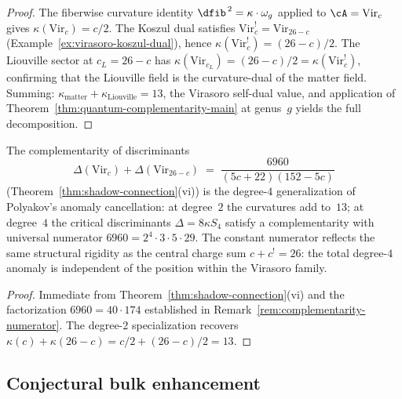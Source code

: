 \begin{proof}
The fiberwise curvature identity $\dfib^{\,2} = \kappa \cdot \omega_g$
applied to $\cA = \mathrm{Vir}_c$ gives
$\kappa(\mathrm{Vir}_c) = c/2$. The Koszul dual satisfies
$\mathrm{Vir}_c^! = \mathrm{Vir}_{26-c}$
(Example~\ref{ex:virasoro-koszul-dual}), hence
$\kappa(\mathrm{Vir}_c^!) = (26{-}c)/2$. The Liouville sector at
$c_L = 26 - c$ has $\kappa(\mathrm{Vir}_{c_L}) = (26{-}c)/2
= \kappa(\mathrm{Vir}_c^!)$, confirming that the Liouville field
is the curvature-dual of the matter field. Summing:
$\kappa_{\mathrm{matter}} + \kappa_{\mathrm{Liouville}} = 13$,
the Virasoro self-dual value, and application of
Theorem~\ref{thm:quantum-complementarity-main} at genus~$g$ yields
the full decomposition.
\end{proof}

\begin{corollary}
\label{cor:complementarity-discriminant-cancellation}
The complementarity of discriminants
\[
\Delta(\mathrm{Vir}_c) + \Delta(\mathrm{Vir}_{26-c})
\;=\;
\frac{6960}{(5c{+}22)(152{-}5c)}
\]
\textup{(}Theorem~\textup{\ref{thm:shadow-connection}(vi))} is the
degree-$4$ generalization of Polyakov's anomaly cancellation: at
degree~$2$ the curvatures add to~$13$\textup{;}
at degree~$4$ the critical discriminants
$\Delta = 8\kappa S_4$ satisfy a complementarity with universal
numerator $6960 = 2^4 \cdot 3 \cdot 5 \cdot 29$. The constant
numerator reflects the same structural rigidity as the central
charge sum $c + c^! = 26$: the total degree-$4$ anomaly is
independent of the position within the Virasoro family.
\end{corollary}

\begin{proof}
Immediate from Theorem~\ref{thm:shadow-connection}(vi) and the
factorization $6960 = 40 \cdot 174$ established in
Remark~\ref{rem:complementarity-numerator}. The degree-$2$
specialization recovers $\kappa(c) + \kappa(26{-}c) = c/2 +
(26{-}c)/2 = 13$.
\end{proof}

\subsection{Conjectural bulk enhancement}
\label{subsec:holo-comp-bulk-conjecture}

